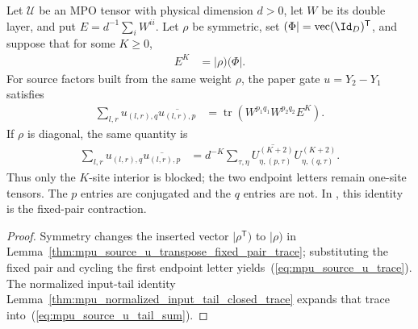 \begin{lemma}
    \label{thm:mpu_source_u_retained_interior}
    \leanok
    Let $\mathcal U$ be an MPO tensor with physical dimension $d>0$, let $W$
    be its double layer, and put $E=d^{-1}\sum_iW^{ii}$. Let $\rho$ be
    symmetric, set $(\Phi\rvert=\operatorname{vec}(\Id_D)^{\mathsf T}$, and
    suppose that for some $K\geq0$,
    \begin{align}
        E^K & =\lvert\rho)(\Phi\rvert.
    \end{align}
    For source factors built from the same weight $\rho$, the paper
    gate $u=Y_2\mathbin{-}Y_1$ satisfies
    \begin{align}
        \sum_{l,r}u_{(l,r),q}\overline{u_{(l,r),p}}
         & =\operatorname{tr}\!\left(W^{p_1q_1}W^{p_2q_2}E^K\right).
        \label{eq:mpu_source_u_trace}
    \end{align}
    If $\rho$ is diagonal, the same quantity is
    \begin{align}
        \sum_{l,r}u_{(l,r),q}\overline{u_{(l,r),p}}
         & = d^{-K}\sum_{\tau,\eta}
        \overline{U^{(K+2)}_{\eta,(p,\tau)}}
        U^{(K+2)}_{\eta,(q,\tau)}.
        \label{eq:mpu_source_u_tail_sum}
    \end{align}
    Thus only the $K$-site interior is blocked; the two endpoint letters remain
    one-site tensors. The $p$ entries are conjugated and the $q$ entries are
    not. In \cite[Lemma~III.7]{Cirac2017MPU}, this identity is the fixed-pair
    contraction.
\end{lemma}

\begin{proof}\leanok
    Symmetry changes the inserted vector
    $\lvert\rho^{\mathsf T})$ to $\lvert\rho)$ in
    Lemma~\ref{thm:mpu_source_u_transpose_fixed_pair_trace}; substituting the
    fixed pair and cycling the first endpoint letter yields~(\ref{eq:mpu_source_u_trace}). The normalized input-tail identity Lemma~\ref{thm:mpu_normalized_input_tail_closed_trace} expands that trace into~(\ref{eq:mpu_source_u_tail_sum}).
\end{proof}

